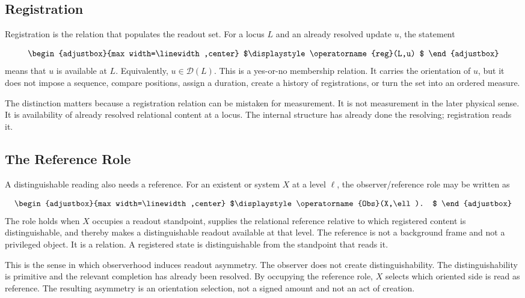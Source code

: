 \subsection{Registration}
Registration is the relation that populates the readout set. For a locus \(L\) and an already resolved update \(u\), the statement

\begin{equation*}
\begin{adjustbox}{max width=\linewidth,center}
$\displaystyle
\operatorname{reg}(L,u)
$
\end{adjustbox}
\end{equation*}
means that \(u\) is available at \(L\). Equivalently, \(u\in\mathcal{D}(L)\). This is a yes-or-no membership relation. It carries the orientation of \(u\), but it does not impose a sequence, compare positions, assign a duration, create a history of registrations, or turn the set into an ordered measure.

The distinction matters because a registration relation can be mistaken for measurement. It is not measurement in the later physical sense. It is availability of already resolved relational content at a locus. The internal structure has already done the resolving; registration reads it.

\subsection{The Reference Role}
A distinguishable reading also needs a reference. For an existent or system \(X\) at a level \(\ell\), the observer/reference role may be written as

\begin{equation*}
\begin{adjustbox}{max width=\linewidth,center}
$\displaystyle
\operatorname{Obs}(X,\ell).
$
\end{adjustbox}
\end{equation*}
The role holds when \(X\) occupies a readout standpoint, supplies the relational reference relative to which registered content is distinguishable, and thereby makes a distinguishable readout available at that level. The reference is not a background frame and not a privileged object. It is a relation. A registered state is distinguishable from the standpoint that reads it.

This is the sense in which observerhood induces readout asymmetry. The observer does not create distinguishability. The distinguishability is primitive and the relevant completion has already been resolved. By occupying the reference role, \(X\) selects which oriented side is read as reference. The resulting asymmetry is an orientation selection, not a signed amount and not an act of creation.

